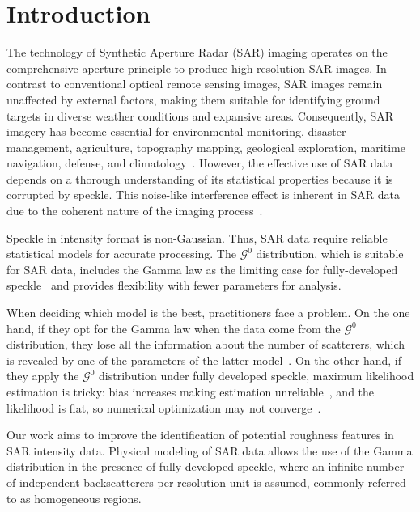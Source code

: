 \chapter{Introduction}\label{chp:int}


The technology of Synthetic Aperture Radar (SAR) imaging operates on the comprehensive aperture principle to produce high-resolution SAR images.
In contrast to conventional optical remote sensing images, SAR images remain unaffected by external factors, making them suitable for identifying ground targets in diverse weather conditions and expansive areas.  
Consequently, SAR imagery has become essential for environmental monitoring, disaster management, agriculture, topography mapping, geological exploration, maritime navigation, defense, and climatology~\citep{Moreira2013, iglesias2013atmospheric, Mu2019}.  
However, the effective use of SAR
data depends on a thorough understanding of its statistical properties
because it is corrupted by speckle. This noise-like interference effect
is inherent in SAR data due to the coherent nature of the imaging
process~\citep{Argenti2013}.

Speckle in intensity format is non-Gaussian. 
Thus, SAR data require reliable statistical models for accurate processing. 
The \(\mathcal{G}^0\) distribution, which is suitable for SAR data, includes
the Gamma law as the limiting case for fully-developed
speckle~\citep{Ferreira2020} and provides flexibility with fewer
parameters for analysis.

When deciding which model is the best, practitioners face a problem. 
On the one hand, if they opt for the Gamma law when the data come from the
\(\mathcal{G}^0\) distribution, they lose all the information about the
number of scatterers, which is revealed by one of the parameters of the
latter model~\citep{Yue2021}. 
On the other hand, if they apply the \(\mathcal{G}^0\) distribution under fully developed speckle, maximum
likelihood estimation is tricky: bias increases making estimation
unreliable~\citep{VasconcellosFrerySilva:CompStat}, and the likelihood is
flat, so numerical optimization may not
converge~\citep{FreryCribariSouza:JASP:04}. 

Our work aims to improve the identification of potential roughness
features in SAR intensity data. 
Physical modeling of SAR data allows the
use of the Gamma distribution in the presence of fully-developed
speckle, where an infinite number of independent backscatterers per
resolution unit is assumed, commonly referred to as homogeneous regions.

